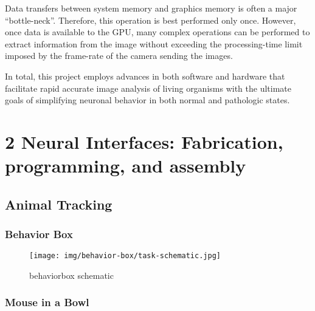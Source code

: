 \documentclass[
  12pt,
  lettersizepaper,
]{book}
\begin{document}
Data transfers between system memory and graphics memory is often a
major ``bottle-neck''. Therefore, this operation is best performed only
once. However, once data is available to the GPU, many complex
operations can be performed to extract information from the image
without exceeding the processing-time limit imposed by the frame-rate of
the camera sending the images.

In total, this project employs advances in both software and hardware
that facilitate rapid accurate image analysis of living organisms with
the ultimate goals of simplifying neuronal behavior in both normal and
pathologic states.

\hypertarget{sec:neural-interfaces-fabrication-programming-and-assembly}{%
\chapter{2 Neural Interfaces: Fabrication, programming, and
assembly}\label{sec:neural-interfaces-fabrication-programming-and-assembly}}

\hypertarget{sec:animal-tracking}{%
\section{Animal Tracking}\label{sec:animal-tracking}}

\hypertarget{sec:behavior-box}{%
\subsection{Behavior Box}\label{sec:behavior-box}}

\begin{figure}
\centering
\texttt{[image: img/behavior-box/task-schematic.jpg]}
\caption{behaviorbox schematic}
\end{figure}

\hypertarget{sec:mouse-in-a-bowl}{%
\subsection{Mouse in a Bowl}\label{sec:mouse-in-a-bowl}}
\end{document}
